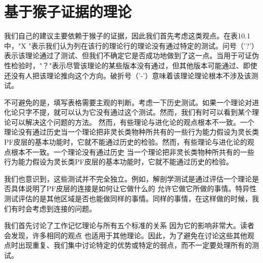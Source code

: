 \section{基于猴子证据的理论}
我们自己的建议主要依赖于猴子的证据，因此我们首先考虑这类观点。在表10.1中，"X "表示我们认为列在该行的理论行的理论没有通过特定的测试。问号（'?'）表示该理论通过了测试、但我们不确定它是否成功地做到了这一点。当用于可证伪性检验时，"？"表示尽管该理论的某些版本没有通过，但其他版本可能通过、即使还没有人把该理论推向这个方向。破折号（'-'）意味着该理论理论根本不涉及该测试。
\par 
不可避免的是，填写表格需要主观的判断。考虑一下历史测试。如果一个理论对进化论只字不提，就可以认为它没有通过这个测试。然而，我们有时可以看到某个理论可以解决这个问题的方法。 然而，有些理论与进化论的观点根本不一致。一个理论没有通过历史当一个理论把非灵长类物种所共有的一些行为能力假设为灵长类PF皮层的基本功能时，它就不能通过历史的检验。然而，有些理论与进化论的观点根本不一致。一个理论没有通过历史 当一个理论把非灵长类物种所共有的一些行为能力假设为灵长类PF皮层的基本功能时，它就不能通过历史的检验。
\par 
我们也意识到，这些测试并不完全独立。例如，解剖学测试是通过评估一个理论是否具体说明了PF皮层的连接是如何让它做什么的 允许它做它所做的事情。特异性测试评估的是其他区域是否也能做同样的事情。同样的事情，在这样做的时候，我们有时会考虑到连接的问题。
\par 
我们首先讨论了工作记忆理论与所有五个标准的关系 因为它的影响非常大。读者会发现，许多相同的观点 也适用于其他理论。因此，为了避免在讨论这些其他观点时出现重复、我们集中讨论特定的优势或特定的弱点，而不一定要处理所有的测试。
